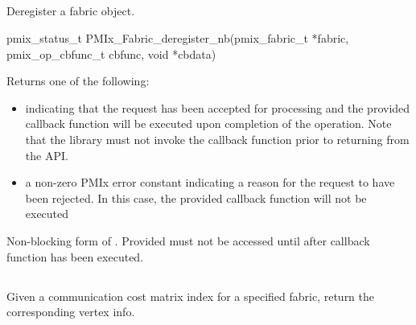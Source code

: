 \subsection{}

\summary

Deregister a fabric object.

\format

\cspecificstart
\begin{codepar}
pmix_status_t PMIx_Fabric_deregister_nb(pmix_fabric_t *fabric,
                            pmix_op_cbfunc_t cbfunc, void *cbdata)
\end{codepar}
\cspecificend

\begin{arglist}
\end{arglist}

Returns one of the following:

\begin{itemize}
\item {} indicating that the request has been accepted for processing and the provided callback function will be executed upon completion of the operation. Note that the library must not invoke the callback function prior to returning from the \ac{API}.
\item a non-zero \ac{PMIx} error constant indicating a reason for the request to have been rejected. In this case, the provided callback function will not be executed
\end{itemize}

\descr

Non-blocking form of . Provided  must not be accessed until after callback function has been executed.


\subsection{}

\summary

Given a communication cost matrix index for a specified fabric, return the corresponding vertex info.

